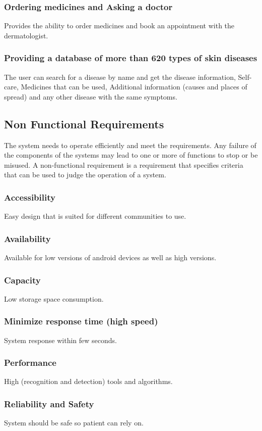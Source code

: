 \subsubsection{Ordering medicines and Asking a doctor}
Provides the ability to order medicines and book an appointment with the dermatologist.
\subsubsection{Providing a database of more than 620 types of skin diseases}
The user can search for a disease by name and get the disease information, Self-care, Medicines that can be used, Additional information (causes and places of spread) and any other disease with the same symptoms.
\subsection{Non Functional Requirements}
The system needs to operate efficiently and meet the requirements. Any failure of the components of the systems may lead to one or more of functions to stop or be misused. A non-functional requirement is a requirement that specifies criteria that can be used to judge the operation of a system.
\subsubsection{Accessibility}Easy design that is suited for different communities to use.
\subsubsection{Availability}Available for low versions of android devices as well as high versions.
\subsubsection{Capacity	}Low storage space consumption.
\subsubsection{Minimize response time (high speed)}System response within few seconds.
\subsubsection{Performance}High (recognition and detection) tools and algorithms.
\subsubsection{Reliability and Safety	}System should be safe so patient can rely on.
